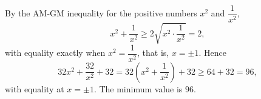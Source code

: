 By the AM-GM inequality for the positive numbers $x^2$ and $\dfrac{1}{x^2}$,
\[x^2+\dfrac{1}{x^2}\ge2\sqrt{x^2\cdot\dfrac{1}{x^2}}=2,\]
with equality exactly when $x^2=\dfrac{1}{x^2}$, that is, $x=\pm1$. Hence
\[32x^2+\dfrac{32}{x^2}+32=32\left(x^2+\dfrac{1}{x^2}\right)+32\ge64+32=96,\]
with equality at $x=\pm1$. The minimum value is $\boxed{96}$.
